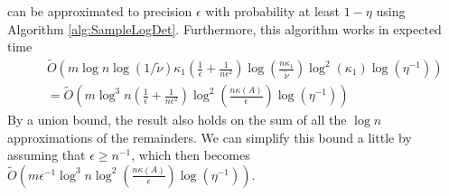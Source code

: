 can be approximated to precision $\epsilon$ with probability at least
$1-\eta$ using Algorithm \ref{alg:SampleLogDet}. Furthermore, this
algorithm works in expected time 
\begin{eqnarray*}
 &  & \tilde{O}\left(m\log n\log\left(1/\tilde{\nu}\right)\kappa_1\left(\frac{1}{\epsilon}+\frac{1}{n\epsilon^{2}}\right)\log\left(\frac{n\kappa_1}{\tilde{\nu}}\right)\log^{2}\left(\kappa_1\right)\log\left(\eta^{-1}\right)\right)\\
 &  & =\tilde{O}\left(m\log^{3}n\left(\frac{1}{\epsilon}+\frac{1}{n\epsilon^{2}}\right)\log^{2}\left(\frac{n\kappa\left(A\right)}{\epsilon}\right)\log\left(\eta^{-1}\right)\right)
\end{eqnarray*}
By a union bound, the result also holds on the sum of all the $\log n$
approximations of the remainders. We can simplify this bound a little
by assuming that $\epsilon\geq n^{-1}$, which then becomes $\tilde{O}\left(m\epsilon^{-1}\log^{3}n\log^{2}\left(\frac{n\kappa\left(A\right)}{\epsilon}\right)\log\left(\eta^{-1}\right)\right)$. 

